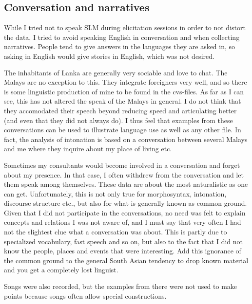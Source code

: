 \subsection{Conversation and narratives}
While I tried not to speak SLM during elicitation sessions in order to not distort the data, I tried to avoid speaking English in conversation and when collecting narratives. People tend to give answers in the languages they are asked in, so asking in English would give stories in English, which was not desired. 

The inhabitants of Lanka are generally very sociable and love to chat. The Malays are no exception to this. They integrate foreigners very well, and so there is some linguistic production of mine to be found in the cvs-files. As far as I can see, this has not altered the speak of the Malays in general. I do not think that they accomodated their speech beyond reducing speed and articulating better (and even that they did not always do). I thus feel that examples from these conversations can be used to illustrate language use as well as any other file. In fact, the analysis of intonation is based on a conversation between several Malays and me where they inquire about my place of living etc. 

Sometimes my consultants would become involved in a conversation and forget about my presence. In that case, I often withdrew from the conversation and let them speak among themselves. These data are about the most naturalistic as one can get. Unfortunately, this is not only true for morphosyntax, intonation, discourse structure etc., but also for what is generally known as common ground. Given that I did not participate in the conversations, no need was felt to explain concepts and relations I was not aware of, and I must say that very often I had not the slightest clue what a conversation was about. This is partly due to specialized vocabulary, fast speech and so on, but also to the fact that I did not know the people, places and events that were interesting. Add this ignorance of the common ground to the general South Asian tendency to drop known material and you get a completely lost linguist.

Songs were also recorded, but the examples from there were not used to make points because songs often allow special constructions.

